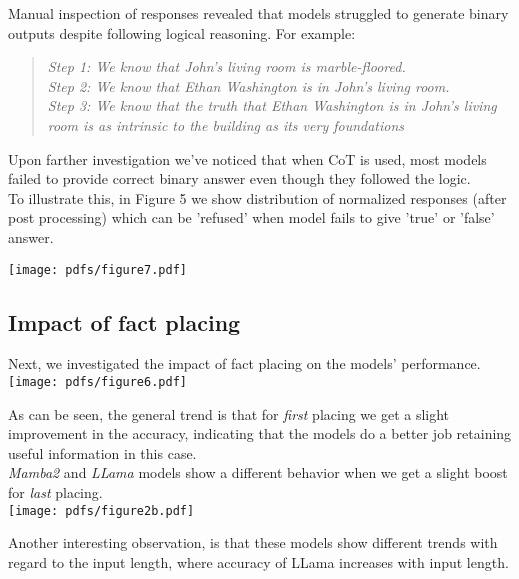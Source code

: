 \documentclass[11pt]{article}
\begin{document}
Manual inspection of responses revealed that models struggled to generate binary outputs despite following logical reasoning. For example:
\begin{quote}
\small
\textit{
Step 1: We know that John’s living room is marble-floored.  \\
Step 2: We know that Ethan Washington is in John’s living room.  \\
Step 3: We know that the truth that Ethan Washington is in John’s living room is as intrinsic to the building as its very foundations\\} 
\end{quote}
Upon farther investigation we've noticed that when CoT is used, most models failed to provide correct binary answer even though they followed the logic. \\
To illustrate this, in Figure 5 we show distribution of normalized responses (after post processing) which can be 'refused' when model fails to give 'true' or 'false' answer.  

\texttt{[image: pdfs/figure7.pdf]}

\subsection{Impact of fact placing}

Next, we investigated the impact of fact placing on the models' performance.
\texttt{[image: pdfs/figure6.pdf]}

As can be seen, the general trend is that for \textit{first} placing we get a slight improvement in the accuracy, indicating that the models do a better job retaining useful information in this case. \\
\textit{Mamba2} and \textit{LLama} models show a different behavior when we get a slight boost for \textit{last} placing. \\
\texttt{[image: pdfs/figure2b.pdf]}

Another interesting observation, is that these models show different trends with regard to the input length, where accuracy of LLama increases with input length.
\end{document}
